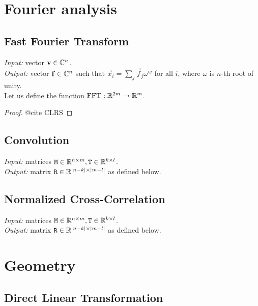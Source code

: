 \section{Fourier analysis}

\subsection{Fast Fourier Transform}
\textit{Input:} vector $\mathbf{v} \in \mathbb{C}^n$.\\
\textit{Output:} vector $\mathbf{f} \in \mathbb{C}^n$ such that $\vec x_i = \sum_j \vec f_j \omega^{i j}$ for all $i$, where $\omega$ is $n$-th root of unity.\\

Let us define the function $\mathrm{FFT}: \mathbb{R}^{2m} \to \mathbb{R}^m$.

\begin{proof}
@cite CLRS
\end{proof}

\subsection{Convolution}

\textit{Input:} matrices $\mathtt{M} \in \mathbb{R}^{n \times m}, \mathtt{T} \in \mathbb{R}^{k \times l}$.\\
\textit{Output:} matrix $\mathtt{R} \in \mathbb{R}^{|n-k| \times |m - l|}$ as defined below.\\

\subsection{Normalized Cross-Correlation}

\textit{Input:} matrices $\mathtt{M} \in \mathbb{R}^{n \times m}, \mathtt{T} \in \mathbb{R}^{k \times l}$.\\
\textit{Output:} matrix $\mathtt{R} \in \mathbb{R}^{|n-k| \times |m - l|}$ as defined below.\\


\section{Geometry}

\subsection{Direct Linear Transformation}

